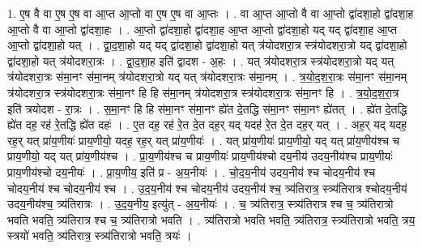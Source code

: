 \documentclass[17pt]{extarticle}
\begin{document}
1. ए॒ष वै वा ए॒ष ए॒ष वा आ॒प्त आ॒प्तो वा ए॒ष ए॒ष वा आ॒प्तः । . वा आ॒प्त आ॒प्तो वै वा आ॒प्तो द्वा॑दशा॒हो द्वा॑दशा॒ह आ॒प्तो वै वा आ॒प्तो द्वा॑दशा॒हः । . आ॒प्तो द्वा॑दशा॒हो द्वा॑दशा॒ह आ॒प्त आ॒प्तो द्वा॑दशा॒हो यद् यद् द्वा॑दशा॒ह आ॒प्त आ॒प्तो द्वा॑दशा॒हो यत् । . द्वा॒द॒शा॒हो यद् यद् द्वा॑दशा॒हो द्वा॑दशा॒हो यत् त्र॑योदशरा॒त्र स्त्र॑योदशरा॒त्रो यद् द्वा॑दशा॒हो द्वा॑दशा॒हो यत् त्र॑योदशरा॒त्रः । . द्वा॒द॒शा॒ह इति॑ द्वादश - अ॒हः । . यत् त्र॑योदशरा॒त्र स्त्र॑योदशरा॒त्रो यद् यत् त्र॑योदशरा॒त्रः स॑मा॒नꣳ स॑मा॒नम् त्र॑योदशरा॒त्रो यद् यत् त्र॑योदशरा॒त्रः स॑मा॒नम् । . त्र॒यो॒द॒श॒रा॒त्रः स॑मा॒नꣳ स॑मा॒नम् त्र॑योदशरा॒त्र स्त्र॑योदशरा॒त्रः स॑मा॒नꣳ हि हि स॑मा॒नम् त्र॑योदशरा॒त्र स्त्र॑योदशरा॒त्रः स॑मा॒नꣳ हि । . त्र॒यो॒द॒श॒रा॒त्र इति॑ त्रयोदश - रा॒त्रः । . स॒मा॒नꣳ हि हि स॑मा॒नꣳ स॑मा॒नꣳ ह्ये॑त दे॒तद्धि स॑मा॒नꣳ स॑मा॒नꣳ ह्ये॑तत् । . ह्ये॑त दे॒तद्धि ह्ये॑त दह॒ रह॑ रे॒तद्धि ह्ये॑त दहः॑ । . ए॒त दह॒ रह॑ रे॒त दे॒त दह॒र् यद् यदह॑ रे॒त दे॒त दह॒र् यत् । . अह॒र् यद् यदह॒ रह॒र् यत् प्रा॑य॒णीयः॑ प्राय॒णीयो॒ यदह॒ रह॒र् यत् प्रा॑य॒णीयः॑ । . यत् प्रा॑य॒णीयः॑ प्राय॒णीयो॒ यद् यत् प्रा॑य॒णीय॑श्च च प्राय॒णीयो॒ यद् यत् प्रा॑य॒णीय॑श्च । . प्रा॒य॒णीय॑श्च च प्राय॒णीयः॑ प्राय॒णीय॑श्चो दय॒नीय॑ उदय॒नीय॑श्च प्राय॒णीयः॑ प्राय॒णीय॑श्चो दय॒नीयः॑ । . प्रा॒य॒णीय॒ इति॑ प्र - अ॒य॒नीयः॑ । . चो॒द॒य॒नीय॑ उदय॒नीय॑ श्च चोदय॒नीय॑ श्च चोदय॒नीय॑ श्च चोदय॒नीय॑ श्च । . उ॒द॒य॒नीय॑ श्च चोदय॒नीय॑ उदय॒नीय॑ श्च॒ त्र्य॑तिरात्र॒ स्त्र्य॑तिरात्र श्चोदय॒नीय॑ उदय॒नीय॑श्च॒ त्र्य॑तिरात्रः । . उ॒द॒य॒नीय॒ इत्यु॑त् - अ॒य॒नीयः॑ । . च॒ त्र्य॑तिरात्र॒ स्त्र्य॑तिरात्र श्च च॒ त्र्य॑तिरात्रो भवति भवति॒ त्र्य॑तिरात्र श्च च॒ त्र्य॑तिरात्रो भवति । . त्र्य॑तिरात्रो भवति भवति॒ त्र्य॑तिरात्र॒ स्त्र्य॑तिरात्रो भवति॒ त्रय॒ स्त्रयो॑ भवति॒ त्र्य॑तिरात्र॒ स्त्र्य॑तिरात्रो भवति॒ त्रयः॑ । \newline
\end{document}
